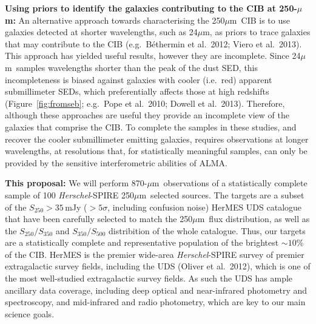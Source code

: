 \documentclass[11pt,a4paper]{article}
\newcommand{\herschel}{{\it Herschel}}
\newcommand{\micron}{$\mu$m}
\begin{document}
\vspace{0.3cm}
{\bf Using priors to identify the galaxies contributing to the CIB
  at 250-\micron:}
%
An alternative approach towards characterising the 250\micron\ CIB is
to use galaxies detected at shorter wavelengths, such as 24\micron, as
priors to trace galaxies that may contribute to the CIB (e.g.\
B\'ethermin et al.\ 2012; Viero et al.\ 2013). This approach has
yielded useful results, however they are incomplete. Since 24\micron\
samples wavelengths shorter than the peak of the dust SED, this
incompleteness is biased against galaxies with cooler (i.e.\ red) apparent
submillimeter SEDs, which preferentially affects those at
high redshifts (Figure~\ref{fig:fromseb}; e.g.\ Pope et al.\ 2010; Dowell et al.\ 2013). Therefore, although these
approaches are useful they provide an incomplete view of the galaxies
that comprise the CIB. To complete the samples in these studies, and recover the cooler
submillimeter emitting galaxies, requires observations at longer
wavelengths, at resolutions that, for statistically meaningful samples, can only be provided by
the sensitive interferometric abilities of ALMA.  


\vspace{0.3cm}
{\bf This proposal:}
%
We will perform 870-\micron\ observations of a statistically complete
sample of 100 \herschel-SPIRE 250\micron\ selected sources. The
targets are a subset of the $S_{250}>35$\,mJy ($>5\sigma$, including
confusion noise) HerMES UDS catalogue that have been carefully selected
to match the 250\micron\ flux distribution, as well as the
$S_{250}/S_{350}$ and $S_{350}/S_{500}$ distribition of the whole
catalogue. Thus, our targets are a statistically complete and
representative population of the brightest $\sim10\%$ of the CIB.
HerMES is the premier wide-area \herschel-SPIRE survey of premier
extragalactic survey fields, including the UDS (Oliver et al.\
2012), which is one of the most well-studied extragalactic survey
fields. As such the UDS has ample ancillary data coverage, including deep optical and
near-infrared photometry and spectroscopy, and mid-infrared and radio
photometry, which are key to our main science goals.
\end{document}
